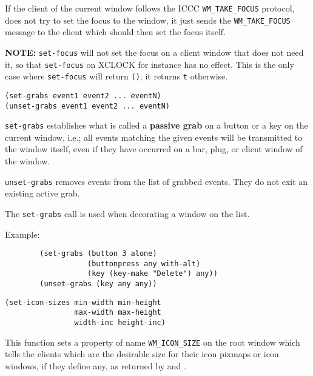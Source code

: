 If the client of the current window follows the ICCC
\verb"WM_TAKE_FOCUS" protocol, {\GWM} does not try to set the focus to the
window, it just sends the \verb"WM_TAKE_FOCUS" message to the client
which should then set the focus itself.

{\bf NOTE:} \verb"set-focus" will not set the focus on a client window that
does not need it, so that \verb"set-focus" on XCLOCK for instance has no
effect. This is the only case where \verb"set-focus" will return \verb"()";
it returns \verb"t" otherwise.


{\usagefont\begin{verbatim}
(set-grabs event1 event2 ... eventN)
(unset-grabs event1 event2 ... eventN)
\end{verbatim}}\usageupspace

{\tt set-grabs} establishes what is called a {\bf passive grab} on a button
or a key on the current window, i.e.; all events matching the given events
will be transmitted to the window itself, even if they have occurred on a
bar, plug, or client window of the window.

{\tt unset-grabs} removes events from the list of grabbed events. They do
not exit an existing active grab.

The {\tt set-grabs} call is used when decorating a window on the
 list.

Example:{\exemplefont\upspace\begin{verbatim}
        (set-grabs (button 3 alone) 
                   (buttonpress any with-alt)
                   (key (key-make "Delete") any))
        (unset-grabs (key any any))
\end{verbatim}}


        
{\usagefont\begin{verbatim}
(set-icon-sizes min-width min-height
                max-width max-height
                width-inc height-inc)
\end{verbatim}}\usageupspace

This function sets a property of name \verb"WM_ICON_SIZE" on the root window
which tells the clients which are the desirable size for their icon pixmaps
or icon windows, if they define any, as returned by 
 and .

        

